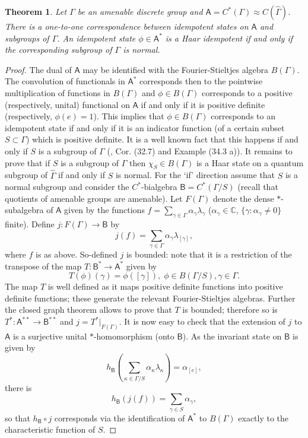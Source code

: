 \documentclass[12pt]{amsart}
\newtheorem{theorem}{Theorem}[section]
\theoremstyle{definition}
\theoremstyle{remark}
\numberwithin{equation}{section}
\begin{document}
\begin{theorem} \label{cocom}
Let $\Gamma$ be an amenable discrete group and $\mathsf{A}=C^*(\Gamma)\approx C(\hat{\Gamma})$. There is a one-to-one correspondence between idempotent states
on $\mathsf{A}$ and subgroups of $\Gamma$. An idempotent state $\phi\in \mathsf{A}^*$ is a Haar idempotent if and only if the corresponding
subgroup of $\Gamma$ is normal.
\end{theorem}
\begin{proof}
The dual of $\mathsf{A}$ may be identified with the Fourier-Stieltjes algebra $B(\Gamma)$. The convolution of functionals in $\mathsf{A}^*$
corresponds then to the pointwise multiplication of functions in $B(\Gamma)$ and $\phi\in B(\Gamma)$ corresponds to a positive
(respectively, unital) functional on $\mathsf{A}$ if and only if it is positive definite (respectively, $\phi(e)=1$). This implies that
$\phi \in B(\Gamma)$ corresponds to an idempotent state if and only if it is an indicator function (of a certain subset $S
\subset \Gamma$) which is positive definite. It is a well known fact that this happens if and only if $S$ is a subgroup of
$\Gamma$ (\cite{hewitt+ross70}, Cor. (32.7) and Example (34.3 a)). It remains to prove that if $S$ is a subgroup of $\Gamma$ then
$\chi_S \in B(\Gamma)$ is a Haar state on a quantum subgroup of $\hat{\Gamma}$ if and only if $S$ is normal. For the `if' direction
assume that $S$ is a normal subgroup and consider the $C^*$-bialgebra $\mathsf{B}=C^*(\Gamma/S)$ (recall that quotients of
amenable groups are amenable). Let $F(\Gamma)$ denote the dense $*$-subalgebra of $\mathsf{A}$ given by the functions $f= \sum_{\gamma
\in \Gamma} \alpha_{\gamma} \lambda_{\gamma}$ ($\alpha_{\gamma} \in \mathbb{C}$, $\{\gamma: \alpha_{\gamma} \neq 0\}$ finite). Define
$j:F(\Gamma) \to \mathsf{B}$ by
\[
j(f)= \sum_{\gamma \in \Gamma}  \alpha_{\gamma}\lambda_{[\gamma]},
\]
where $f$ is as above. So-defined $j$ is bounded: note that it is a restriction of the transpose of the map
$T: \mathsf{B}^* \to \mathsf{A}^*$ given by
\[
T(\phi) (\gamma) = \phi( [\gamma]), \; \phi \in B(\Gamma / S),  \gamma \in \Gamma.
\]
The map $T$ is well defined as it maps positive definite functions into positive definite functions; these generate the relevant
Fourier-Stieltjes algebras. Further the closed graph theorem allows to prove that $T$ is bounded; therefore so is $T^*: \mathsf{A}^{**}
\to \mathsf{B}^{**}$ and $j=T^*|_{F(\Gamma)}$. It is now easy to check that the extension of $j$ to $\mathsf{A}$ is a surjective unital
$*$-homomorphism (onto $\mathsf{B}$).
 As the invariant state on $\mathsf{B}$ is given by
\[
h_{\mathsf{B}} \left(\sum_{\kappa \in \Gamma/S}  \alpha_{\kappa} \lambda_{\kappa} \right) = \alpha_{[e]},
\]
there is
\[
h_{\mathsf{B}} (j(f)) = \sum_{\gamma \in S} \alpha_{\gamma},
\]
so that $h_{\mathsf{B}} \circ j$ corresponds via the identification of $\mathsf{A}^*$ to $B(\Gamma)$
exactly to the characteristic function of $S$.


\end{proof}
\end{document}
